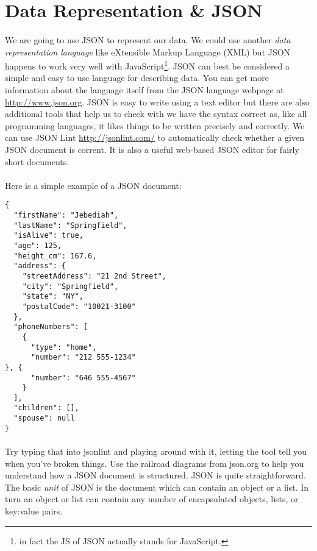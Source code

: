 \documentclass[10pt, a4paper]{article}
\begin{document}
\paragraph{} 

\section{Data Representation \& JSON}
\paragraph{} We are going to use JSON to represent our data. We could use another \emph{data representation language} like eXtensible Markup Language (XML) but JSON happens to work very well with JavaScript\footnote{in fact the JS of JSON actually stands for JavaScript.}. JSON can best be considered a simple and easy to use language for describing data. You can get more information about the language itself from the JSON language webpage at \url{http://www.json.org}. JSON is easy to write using a text editor but there are also additional tools that help us to check with we have the syntax correct as, like all programming languages, it likes things to be written precisely and correctly. We can use JSON Lint \url{http://jsonlint.com/} to automatically check whether a given JSON document is corrent. It is also a useful web-based JSON editor for fairly short documents.

\paragraph{} Here is a simple example of a JSON document:
\begin{lstlisting}
{
  "firstName": "Jebediah",
  "lastName": "Springfield",
  "isAlive": true,
  "age": 125,
  "height_cm": 167.6,
  "address": {
    "streetAddress": "21 2nd Street",
    "city": "Springfield",
    "state": "NY",
    "postalCode": "10021-3100"
  },
  "phoneNumbers": [
    {
      "type": "home",
      "number": "212 555-1234"
}, {
      "number": "646 555-4567"
    }
  ],
  "children": [],
  "spouse": null
}
\end{lstlisting}

\paragraph{} Try typing that into jsonlint and playing around with it, letting the tool tell you when you've broken things. Use the railroad diagrams from json.org to help you understand how a JSON document is structured. JSON is quite straightforward. The basic \emph{unit} of JSON is the document which can contain an object or a list. In turn an object or list can contain any number of encapsulated objects, lists, or key:value pairs.
\end{document}
